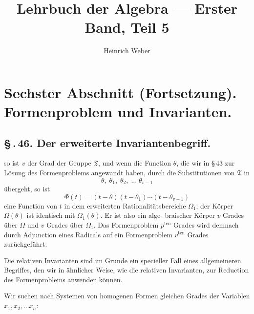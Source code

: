 \documentclass[12pt,a4paper]{article}
\title{Lehrbuch der Algebra --- Erster Band, Teil 5}
\author{Heinrich Weber}
\date{}
\theoremstyle{plain}
\theoremstyle{definition}
\theoremstyle{remark}
\newcommand{\sect}[1]{\S\,.\,#1.}
\begin{document}
\maketitle

\section*{Sechster Abschnitt (Fortsetzung). Formenproblem und Invarianten.}

\subsection*{\sect{46} Der erweiterte Invariantenbegriff.}

so ist $v$ der Grad der Gruppe $\mathfrak{T}$, und wenn die Function $\theta$, die
wir in \S\,43 zur L\"osung des Formenproblems angewandt haben,
durch die Substitutionen von $\mathfrak{T}$ in
\[
\theta,\; \theta_1,\; \theta_2,\; \ldots\; \theta_{v-1}
\]
\"ubergeht, so ist
\[
\Phi(t)=(t-\theta)(t-\theta_1)\cdots(t-\theta_{v-1})
\]
eine Function von $t$ in dem erweiterten Rationalit\"atsbereiche $\Omega_1$;
der K\"orper $\Omega(\theta)$ ist identisch mit $\Omega_1(\theta)$. Er ist also ein alge-
braischer K\"orper $v$ Grades \"uber $\Omega$ und $v$ Grades \"uber $\Omega_1$.
Das Formenproblem $p^{\text{ten}}$ Grades wird demnach durch Adjunction
eines Radicals auf ein Formenproblem $v^{\text{ten}}$ Grades zur\"uckgef\"uhrt.

\bigskip

\noindent
Die relativen Invarianten sind im Grunde ein specieller Fall
eines allgemeineren Begriffes, den wir in \"ahnlicher Weise, wie
die relativen Invarianten, zur Reduction des Formenproblems
anwenden k\"onnen.

Wir suchen nach Systemen von homogenen Formen gleichen
Grades der Variablen $x_1, x_2, \ldots x_n$:
\end{document}
